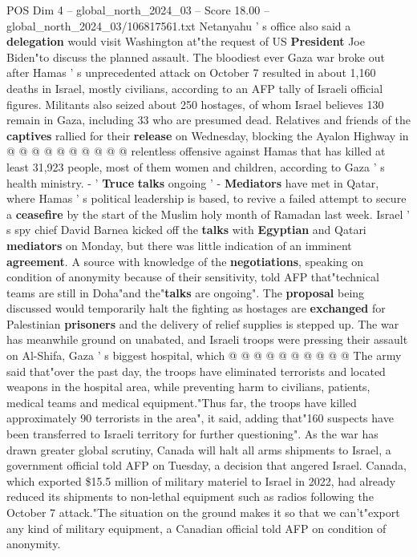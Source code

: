 \begin{textsample}{POS Dim 4 – global\_north\_2024\_03 – Score 18.00 – global\_north\_2024\_03/106817561.txt}
Netanyahu ' s office also said a \textbf{delegation} would visit Washington at"the request of US \textbf{President} Joe Biden"to discuss the planned assault.
The bloodiest ever Gaza war broke out after Hamas ' s unprecedented attack on October 7 resulted in about 1,160 deaths in Israel, mostly civilians, according to an AFP tally of Israeli official figures.
Militants also seized about 250 hostages, of whom Israel believes 130 remain in Gaza, including 33 who are presumed dead.
Relatives and friends of the \textbf{captives} rallied for their \textbf{release} on Wednesday, blocking the Ayalon Highway in @ @ @ @ @ @ @ @ @ @ relentless offensive against Hamas that has killed at least 31,923 people, most of them women and children, according to Gaza ' s health ministry. - ' \textbf{Truce} \textbf{talks} ongoing ' - \textbf{Mediators} have met in Qatar, where Hamas ' s political leadership is based, to revive a failed attempt to secure a \textbf{ceasefire} by the start of the Muslim holy month of Ramadan last week.
Israel ' s spy chief David Barnea kicked off the \textbf{talks} with \textbf{Egyptian} and Qatari \textbf{mediators} on Monday, but there was little indication of an imminent \textbf{agreement}.
A source with knowledge of the \textbf{negotiations}, speaking on condition of anonymity because of their sensitivity, told AFP that"technical teams are still in Doha"and the"\textbf{talks} are ongoing".
The \textbf{proposal} being discussed would temporarily halt the fighting as hostages are \textbf{exchanged} for Palestinian \textbf{prisoners} and the delivery of relief supplies is stepped up.
The war has meanwhile ground on unabated, and Israeli troops were pressing their assault on Al-Shifa, Gaza ' s biggest hospital, which @ @ @ @ @ @ @ @ @ @ The army said that"over the past day, the troops have eliminated terrorists and located weapons in the hospital area, while preventing harm to civilians, patients, medical teams and medical equipment."Thus far, the troops have killed approximately 90 terrorists in the area", it said, adding that"160 suspects have been transferred to Israeli territory for further questioning".
As the war has drawn greater global scrutiny, Canada will halt all arms shipments to Israel, a government official told AFP on Tuesday, a decision that angered Israel.
Canada, which exported \$15.5 million of military materiel to Israel in 2022, had already reduced its shipments to non-lethal equipment such as radios following the October 7 attack."The situation on the ground makes it so that we can't"export any kind of military equipment, a Canadian official told AFP on condition of anonymity.

\end{textsample}

